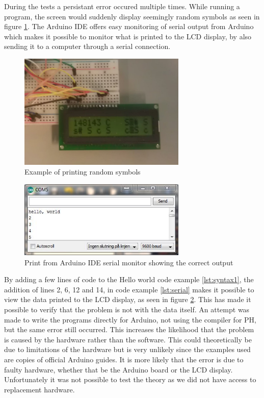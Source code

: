 During the tests a persistant error occured multiple times. While running a program, the screen would suddenly display seemingly random symbols as seen in figure \ref{fig:symbolerror}. The Arduino IDE offers easy monitoring of serial output from Arduino which makes it possible to monitor what is printed to the LCD display, by also sending it to a computer through a serial connection.
\begin{figure}[h]
\centering
\includegraphics[width=8cm]{billeder/test_giberish.jpg}
\caption{Example of printing random symbols}
\label{fig:symbolerror}
\end{figure}

\begin{figure}[hbtp]
\centering
\includegraphics[width=8cm]{billeder/arduino_serial_output.JPG}
\caption{Print from Arduino IDE serial monitor showing the correct output}
\label{fig:serial}
\end{figure}

By adding a few lines of code to the Hello world code example \ref{lst:syntax1}, the addition of lines 2, 6, 12 and 14, in code example \ref{lst:serial} makes it possible to view the data printed to the LCD display, as seen in figure \ref{fig:serial}. This has made it possible to verify that the problem is not with the data itself. An attempt was made to write the programs directly for Arduino, not using the compiler for PH, but the same error still occurred. This increases the likelihood that the problem is caused by the hardware rather than the software. This could theoretically be due to limitations of the hardware but is very unlikely since the examples used are copies of official Arduino guides. It is more likely that the error is due to faulty hardware, whether that be the Arduino board or the LCD display. Unfortunately it was not possible to test the theory as we did not have access to replacement hardware.

